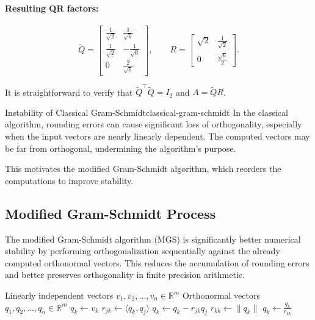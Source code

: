 \documentclass[../../main.tex]{subfiles}
\begin{document}
\paragraph{Resulting QR factors:}
\[
    \widetilde{Q} = \begin{bmatrix}
        \frac{1}{\sqrt{2}} & \frac{1}{\sqrt{6}}  \\
        \frac{1}{\sqrt{2}} & -\frac{1}{\sqrt{6}} \\
        0                  & \frac{2}{\sqrt{6}}
    \end{bmatrix}, \qquad
    R = \begin{bmatrix}
        \sqrt{2} & \frac{1}{\sqrt{2}} \\
        0        & \frac{\sqrt{6}}{2}
    \end{bmatrix}.
\]

It is straightforward to verify that $\widetilde{Q}^\top \widetilde{Q} = I_2$ and $A = \widetilde{Q} R$.

\begin{remark}{Instability of Classical Gram-Schmidt}{classical-gram-schmidt}
    In the classical algorithm, rounding errors can cause significant loss of orthogonality, especially when the input vectors are nearly linearly dependent.
    The computed vectors may be far from orthogonal, undermining the algorithm's purpose.
\end{remark}

This motivates the modified Gram-Schmidt algorithm, which reorders the computations to improve stability.

\subsection{Modified Gram-Schmidt Process}
The modified Gram-Schmidt algorithm (MGS) is significantly better numerical stability by performing orthogonalization sequentially against the already computed orthonormal vectors.
This reduces the accumulation of rounding errors and better preserves orthogonality in finite precision arithmetic.
\begin{algorithm}[H]
    \caption{Modified Gram-Schmidt}
    \begin{algorithmic}
        \Require Linearly independent vectors $v_1, v_2, \ldots, v_n \in \mathbb{R}^m$
        \Ensure Orthonormal vectors $q_1, q_2, \ldots, q_n \in \mathbb{R}^m$
        \State $q_k \leftarrow v_k$
        \State $r_{jk} \leftarrow \langle q_k, q_j \rangle$ 
        \State $q_k \leftarrow q_k - r_{jk} q_j$ 
        \EndFor
        \State $r_{kk} \leftarrow \|q_k\|$
        \State $q_k \leftarrow \frac{q_k}{r_{kk}}$ 
        \EndFor
    \end{algorithmic}
\end{algorithm}
\end{document}
